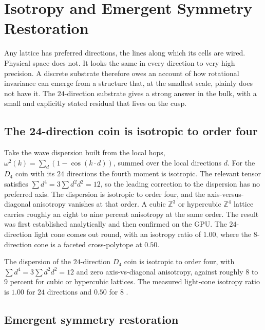 \section{Isotropy and Emergent Symmetry Restoration}

Any lattice has preferred directions, the lines along which its cells are wired. Physical space does not. It looks the same in every direction to very high precision. A discrete substrate therefore owes an account of how rotational invariance can emerge from a structure that, at the smallest scale, plainly does not have it. The $24$-direction substrate gives a strong answer in the bulk, with a small and explicitly stated residual that lives on the cusp.

\subsection{The 24-direction coin is isotropic to order four}

Take the wave dispersion built from the local hops, $\omega^2(k) = \sum_d (1 - \cos(k \cdot d))$, summed over the local directions $d$. For the $D_4$ coin with its $24$ directions the fourth moment is isotropic. The relevant tensor satisfies $\sum d^4 = 3 \sum d^2 d^2 = 12$, so the leading correction to the dispersion has no preferred axis. The dispersion is isotropic to order four, and the axis-versus-diagonal anisotropy vanishes at that order. A cubic $\mathbb{Z}^3$ or hypercubic $\mathbb{Z}^4$ lattice carries roughly an eight to nine percent anisotropy at the same order. The result was first established analytically and then confirmed on the GPU. The $24$-direction light cone comes out round, with an isotropy ratio of $1.00$, where the $8$-direction cone is a faceted cross-polytope at $0.50$.

\begin{result}
The dispersion of the $24$-direction $D_4$ coin is isotropic to order four, with $\sum d^4 = 3 \sum d^2 d^2 = 12$ and zero axis-vs-diagonal anisotropy, against roughly $8$ to $9$ percent for cubic or hypercubic lattices. The measured light-cone isotropy ratio is $1.00$ for $24$ directions and $0.50$ for $8$ \cite{pollard2026vibetest}.
\end{result}

\subsection{Emergent symmetry restoration}

